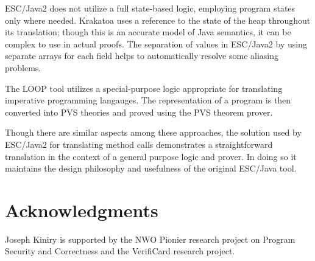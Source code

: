 \documentclass{sig-alternate}
\begin{document}
ESC/Java2 does not utilize a full state-based logic, employing program states only where needed.
Krakatoa uses a reference to the state of the heap throughout its translation; though this is an
accurate model of Java semantics, it can be complex to use in actual proofs.  The separation of
values in ESC/Java2 by using separate arrays for each field helps to automatically resolve some
aliasing problems.

The LOOP tool utilizes a special-purpose logic appropriate for translating imperative programming
langauges.  The representation of a program is then converted into PVS theories and proved
using the PVS theorem prover.

Though there are similar aspects among these approaches, the solution used by ESC/Java2
for translating method calls demonstrates a straightforward translation in the context of 
a general purpose logic and prover.  In doing so it maintains the design philosophy and usefulness
of the original ESC/Java tool.

\section{Acknowledgments}

Joseph Kiniry is supported by the NWO Pionier research
project on Program Security and Correctness and the VerifiCard
research project. 


%

%

  


%
%



\end{document}
